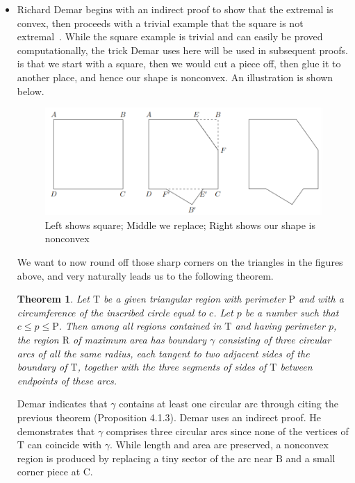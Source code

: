 \documentclass[a4paper]{book}
\newtheorem{theorem}{Theorem}%
\numberwithin{theorem}{section}%
\begin{document}
\begin{itemize}
    \item Richard Demar begins with an indirect proof to show that the extremal is convex, then proceeds with a trivial example that the square is not extremal~\citep{demar1975simple}. While the square example is trivial and can easily be proved computationally, the trick Demar uses here will be used in subsequent proofs. is that we start with a square, then we would cut a piece off, then glue it to another place, and hence our shape is nonconvex. An illustration is shown below.
    \begin{figure}[hbt!]
        \begin{center}   
            \includegraphics[width=120mm]{RichardDemar}
            \caption{Left shows square; Middle we replace; Right shows our shape is nonconvex}
        \end{center}
    \end{figure}\leavevmode
    \newline
    We want to now round off those sharp corners on the triangles in the figures above, and very naturally leads us to the following theorem.
    \begin{theorem}
        Let $\mathrm{T}$ be a given triangular region with perimeter $\mathrm{P}$ and with a circumference of the inscribed circle equal to $c$. Let $p$ be a number such that $c\leq p\leq\mathrm{P}$. Then among all regions contained in $\mathrm{T}$ and having perimeter $p$, the region $\mathrm{R}$ of maximum area has boundary $\gamma$ consisting of three circular arcs of all the same radius, each tangent to two adjacent sides of the boundary of $\mathrm{T}$, together with the three segments of sides of $\mathrm{T}$ between endpoints of these arcs.
    \end{theorem}
    Demar indicates that $\gamma$ contains at least one circular arc through citing the previous theorem (Proposition 4.1.3). Demar uses an indirect proof. He demonstrates that $\gamma$ comprises three circular arcs since none of the vertices of $\mathrm{T}$ can coincide with $\gamma$. While length and area are preserved, a nonconvex region is produced by replacing a tiny sector of the arc near $\mathrm{B}$ and a small corner piece at $\mathrm{C}$.

\end{itemize}
\end{document}
